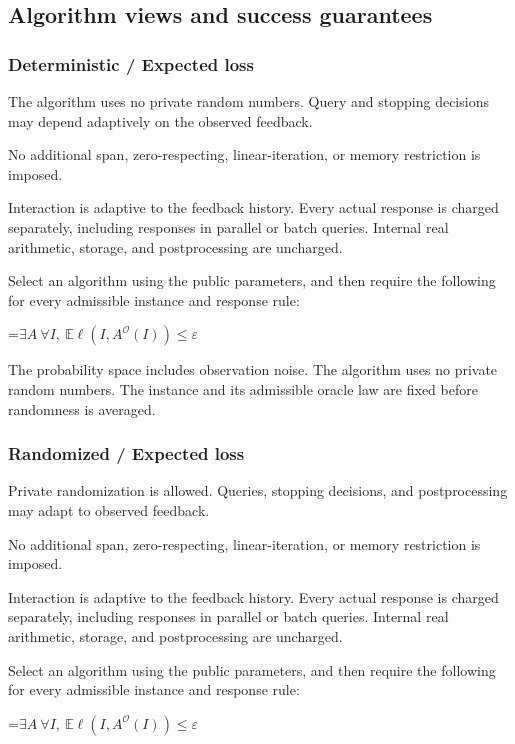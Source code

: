 \documentclass[10pt,a4paper]{article}
\newcommand{\AtlasMath}[1]{\par\begingroup\centering\setbox0=\hbox{$\displaystyle #1$}\ifdim\wd0>1.4\linewidth\typeout{ATLAS WIDE FORMULA: \the\wd0}\fi\ifdim\wd0>\linewidth\resizebox{\linewidth}{!}{\box0}\else\box0\fi\par\endgroup}
\begin{document}
\subsection{Algorithm views and success guarantees}
\subsubsection{Deterministic / Expected loss}
The algorithm uses no private random numbers. Query and stopping decisions may depend adaptively on the observed feedback.

No additional span, zero-respecting, linear-iteration, or memory restriction is imposed.

Interaction is adaptive to the feedback history. Every actual response is charged separately, including responses in parallel or batch queries. Internal real arithmetic, storage, and postprocessing are uncharged.

Select an algorithm using the public parameters, and then require the following for every admissible instance and response rule:


\AtlasMath{\exists A\ \forall I,\ \mathbb{E}\ell(I,A^\mathcal{O}(I))\le\varepsilon}


The probability space includes observation noise. The algorithm uses no private random numbers. The instance and its admissible oracle law are fixed before randomness is averaged.

\subsubsection{Randomized / Expected loss}
Private randomization is allowed. Queries, stopping decisions, and postprocessing may adapt to observed feedback.

No additional span, zero-respecting, linear-iteration, or memory restriction is imposed.

Interaction is adaptive to the feedback history. Every actual response is charged separately, including responses in parallel or batch queries. Internal real arithmetic, storage, and postprocessing are uncharged.

Select an algorithm using the public parameters, and then require the following for every admissible instance and response rule:


\AtlasMath{\exists A\ \forall I,\ \mathbb{E}\ell(I,A^\mathcal{O}(I))\le\varepsilon}
\end{document}
